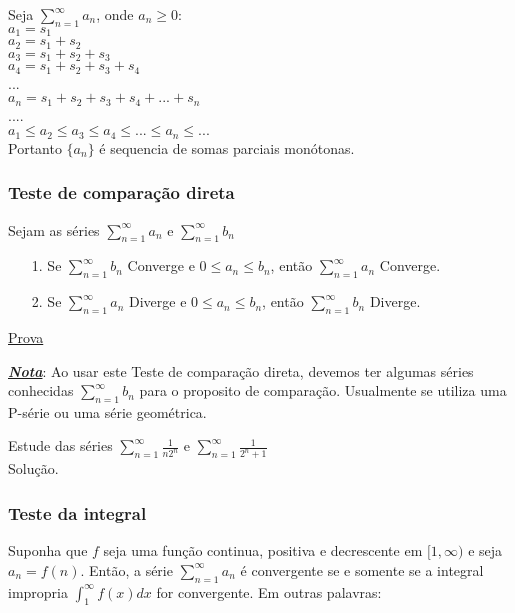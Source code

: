 Seja $\sum_{n=1}^{\infty}a_{n}$, onde $a_{n}\geq 0$:\\
$a_{1}=s_{1}$\\
$a_{2}=s_{1}+s_{2}$\\
$a_{3}=s_{1}+s_{2}+s_{3}$\\
$a_{4}=s_{1}+s_{2}+s_{3}+s_{4}$\\
...\\
$a_{n}=s_{1}+s_{2}+s_{3}+s_{4}+...+s_{n}$\\
....\\

$a_{1}\leq a_{2}\leq a_{3} \leq a_{4}\leq ...\leq a_{n}\leq...$\\

Portanto $\{a_{n}\}$ é sequencia de somas parciais monótonas.
\subsubsection{Teste de comparação direta}
Sejam as séries $\sum_{n=1}^{\infty}a_{n}$ e $\sum_{n=1}^{\infty}b_{n}$\\
\begin{itemize}
	\item[1.] Se $\sum_{n=1}^{\infty}b_{n}$ Converge e $0\leq a_{n}\leq b_{n}$, então $\sum_{n=1}^{\infty}a_{n}$ Converge.
	
	\item[2.]Se $\sum_{n=1}^{\infty}a_{n}$ Diverge e $0\leq a_{n}\leq b_{n}$, então $\sum_{n=1}^{\infty}b_{n}$ Diverge.
\end{itemize}
\underline{Prova}\\
\vspace*{5cm}

\textbf{\textit{\underline{Nota}}}: Ao usar este Teste de comparação direta, devemos  ter algumas séries conhecidas $\sum_{n=1}^{\infty}b_{n}$ para o proposito de comparação. Usualmente se utiliza uma P-série ou uma série geométrica.

\begin{ex}
	Estude das séries $\sum_{n=1}^{\infty}\frac{1}{n2^{n}}$ e  $\sum_{n=1}^{\infty}\frac{1}{2^{n}+1}$\\
	Solução.
\end{ex}
\vspace*{5cm}
\subsubsection{Teste da integral}
Suponha que $f$ seja uma função continua, positiva e decrescente em $[1,\infty)$ e seja $a_{n}=f(n)$. Então, a série $\sum_{n=1}^{\infty}a_{n}$ é convergente se e somente se a integral impropria $\int_{1}^{\infty}f(x)dx$ for convergente. Em outras palavras:\\

